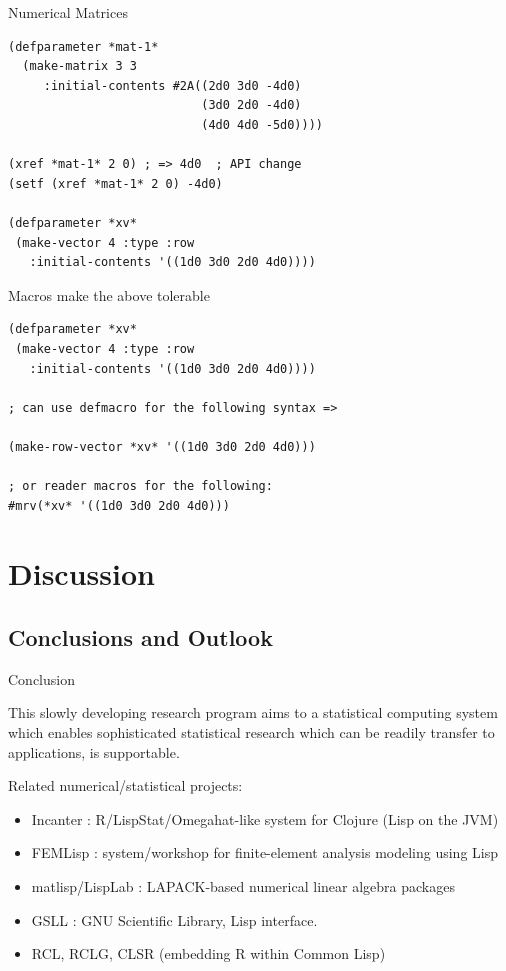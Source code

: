 \documentclass{beamer}
\begin{document}
\begin{frame}[fragile]{Numerical Matrices}
\small{
\begin{verbatim}
(defparameter *mat-1*
  (make-matrix 3 3
     :initial-contents #2A((2d0 3d0 -4d0)
                           (3d0 2d0 -4d0)
                           (4d0 4d0 -5d0))))

(xref *mat-1* 2 0) ; => 4d0  ; API change
(setf (xref *mat-1* 2 0) -4d0) 

(defparameter *xv*
 (make-vector 4 :type :row 
   :initial-contents '((1d0 3d0 2d0 4d0))))
\end{verbatim}
}
\end{frame}

\begin{frame}[fragile]{Macros make the above tolerable}
\begin{verbatim}
(defparameter *xv*
 (make-vector 4 :type :row 
   :initial-contents '((1d0 3d0 2d0 4d0))))

; can use defmacro for the following syntax =>

(make-row-vector *xv* '((1d0 3d0 2d0 4d0)))

; or reader macros for the following:
#mrv(*xv* '((1d0 3d0 2d0 4d0)))
\end{verbatim}
\end{frame}

\section{Discussion}

\subsection{Conclusions and Outlook}


\begin{frame}{Conclusion}

  This slowly developing research program aims to a statistical
  computing system which enables sophisticated statistical research
  which can be readily transfer to applications, is supportable.

  Related numerical/statistical projects:
  \begin{itemize}
  \item Incanter : R/LispStat/Omegahat-like system for Clojure (Lisp
    on the JVM)
  \item FEMLisp : system/workshop for finite-element analysis modeling
    using Lisp
  \item matlisp/LispLab : LAPACK-based numerical linear algebra packages
  \item GSLL : GNU Scientific Library, Lisp interface.
  \item RCL, RCLG, CLSR (embedding R within Common Lisp)
  \end{itemize}
\end{frame}
\end{document}
